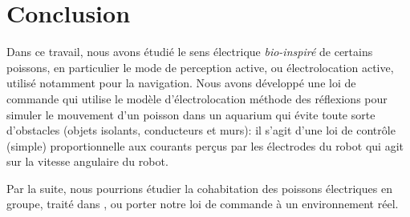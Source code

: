 \section{Conclusion}
Dans ce travail, nous avons étudié le sens électrique \textit{bio-inspiré} de certains poissons, en particulier le mode de perception active, ou électrolocation active, utilisé notamment pour la navigation. Nous avons développé une loi de commande qui utilise le modèle d'électrolocation \og méthode des réflexions \fg{} pour simuler le mouvement d'un poisson dans un aquarium qui évite toute sorte d'obstacles (objets isolants, conducteurs et murs): il s'agit d'une loi de contrôle (simple) proportionnelle aux courants perçus par les électrodes du robot qui agit sur la vitesse angulaire du robot. 

Par la suite, nous pourrions étudier la cohabitation des poissons électriques en groupe, traité dans \cite{BENACHENHOU2014}, ou porter notre loi de commande à un environnement réel. 